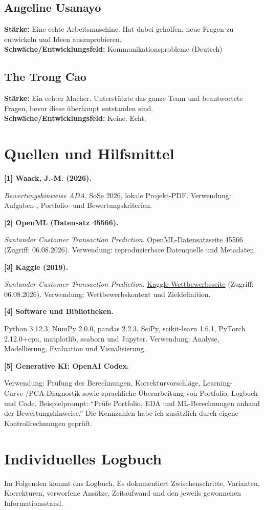 \documentclass[10pt,a4paper]{article}
\newcommand{\sourceitem}[2]{\noindent\textbf{#1}\par\noindent #2\par\smallskip}
\begin{document}
\subsection*{Angeline Usanayo}
\textbf{Stärke:} Eine echte Arbeitsmaschine. Hat dabei geholfen, neue Fragen zu entwickeln und Ideen auszuprobieren.\\
\textbf{Schwäche/Entwicklungsfeld:} Kommunikationsprobleme (Deutsch)

\subsection*{The Trong Cao}
\textbf{Stärke:} Ein echter Macher. Unterstützte das ganze Team und beantwortete Fragen, bevor diese überhaupt entstanden sind.\\
\textbf{Schwäche/Entwicklungsfeld:} Keine. Echt. 

\section{Quellen und Hilfsmittel}
\label{sec:sources}

\sourceitem{[1] Waack, J.-M. (2026).}{\emph{Bewertungshinweise ADA}, SoSe 2026,
lokale Projekt-PDF. Verwendung: Aufgaben-, Portfolio- und Bewertungskriterien.}

\sourceitem{[2] OpenML (Datensatz 45566).}{\emph{Santander Customer Transaction
Prediction}. \href{https://www.openml.org/search?type=data\&status=active\&id=45566}{OpenML-Datensatzseite 45566}
(Zugriff: 06.08.2026). Verwendung: reproduzierbare Datenquelle und Metadaten.}

\sourceitem{[3] Kaggle (2019).}{\emph{Santander Customer Transaction Prediction}.
\href{https://www.kaggle.com/c/santander-customer-transaction-prediction}{Kaggle-Wettbewerbsseite}
(Zugriff: 06.08.2026). Verwendung: Wettbewerbskontext und Zieldefinition.}

\sourceitem{[4] Software und Bibliotheken.}{Python 3.12.3, NumPy 2.0.0, pandas 2.2.3,
SciPy, scikit-learn 1.6.1, PyTorch 2.12.0+cpu, matplotlib, seaborn und Jupyter.
Verwendung: Analyse, Modellierung, Evaluation und Visualisierung.}

\sourceitem{[5] Generative KI: OpenAI Codex.}{Verwendung: Prüfung der Berechnungen,
Korrekturvorschläge, Learning-Curve-/PCA-Diagnostik sowie sprachliche Überarbeitung von
Portfolio, Logbuch und Code. Beispielprompt: ``Prüfe Portfolio, EDA und ML-Berechnungen
anhand der Bewertungshinweise.'' Die Kennzahlen habe ich zusätzlich durch eigene
Kontrollrechnungen geprüft.}

\clearpage
\appendix
\section{Individuelles Logbuch}
\label{sec:logbook}

Im Folgenden kommt das Logbuch.
Es dokumentiert Zwischenschritte, Varianten, Korrekturen, verworfene Ansätze, Zeitaufwand
und den jeweils gewonnenen Informationsstand.


\end{document}
